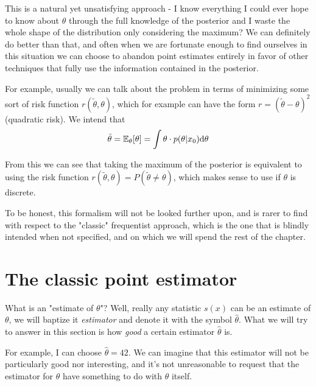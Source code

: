 This is a natural yet unsatisfying approach - I know everything I could ever hope to know about $\theta$ through the full knowledge of the posterior and I waste the whole shape of the distribution only considering the maximum? We can definitely do better than that, and often when we are fortunate enough to find ourselves in this situation we can choose to abandon point estimates entirely in favor of other techniques that fully use the information contained in the posterior. 

For example, usually we can talk about the problem in terms of minimizing some sort of risk function $r(\tilde{\theta},\theta)$, which for example can have the form $r = (\tilde{\theta}-\theta)^2$ (quadratic risk). We intend that
	\[
	\tilde{\theta} = \mathbb{E}_\theta[\theta] = \int\theta\cdot p(\theta|x_0)\mathrm{d} \theta
	\]

From this we can see that taking the maximum of the posterior is equivalent to using the risk function $r(\tilde{\theta},\theta)=P(\tilde{\theta}\neq\theta)$, which makes sense to use if $\theta$ is discrete. 

To be honest, this formalism will not be looked further upon, and is rarer to find with respect to the "classic" frequentist approach, which is the one that is blindly intended when not specified, and on which we will spend the rest of the chapter.

\section{The classic point estimator}

What is an "estimate of $\theta$"? Well, really any statistic $s(x)$ can be an estimate of $\theta$, we will baptize it \emph{estimator} and denote it with the symbol $\hat{\theta}$. What we will try to answer in this section is how \emph{good} a certain estimator $\hat{\theta}$ is.

For example, I can choose $\hat{\theta}=42$. We can imagine that this estimator will not be particularly good nor interesting, and it's not unreasonable to request that the estimator for $\theta$ have something to do with $\theta$ itself.

